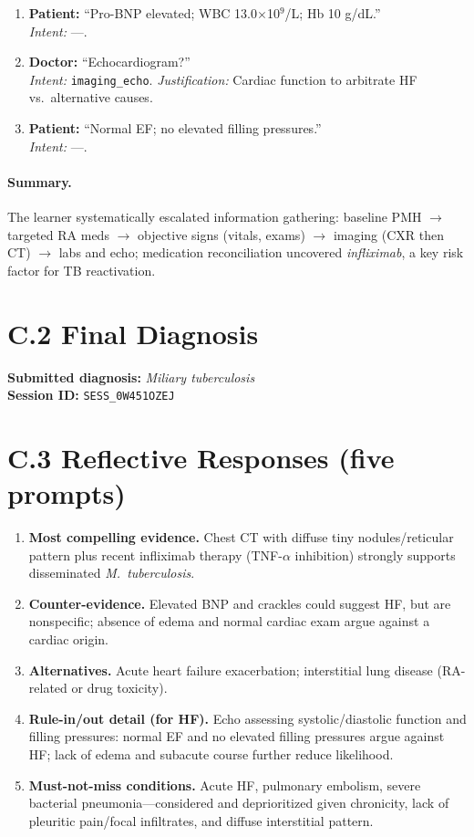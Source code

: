 \begin{enumerate}
  \item \textbf{Patient:} ``Pro-BNP elevated; WBC 13.0$\times$10$^{9}$/L; Hb 10 g/dL.'' \\
  \emph{Intent:} ---.

  \item \textbf{Doctor:} ``Echocardiogram?'' \\
  \emph{Intent:} \texttt{imaging\_echo}. \emph{Justification:} Cardiac function to arbitrate HF vs.\ alternative causes.

  \item \textbf{Patient:} ``Normal EF; no elevated filling pressures.'' \\
  \emph{Intent:} ---.
\end{enumerate}

\paragraph{Summary.} The learner systematically escalated information gathering: baseline PMH $\rightarrow$ targeted RA meds $\rightarrow$ objective signs (vitals, exams) $\rightarrow$ imaging (CXR then CT) $\rightarrow$ labs and echo; medication reconciliation uncovered \emph{infliximab}, a key risk factor for TB reactivation.

\section*{C.2 \quad Final Diagnosis}
\label{app:session_s6:diagnosis}
\noindent
\textbf{Submitted diagnosis:} \emph{Miliary tuberculosis} \\
\textbf{Session ID:} \texttt{SESS\_0W451OZEJ}

\section*{C.3 \quad Reflective Responses (five prompts)}
\label{app:session_s6:reflection}
\begin{enumerate}
  \item \textbf{Most compelling evidence.} Chest CT with diffuse tiny nodules/reticular pattern plus recent infliximab therapy (TNF-$\alpha$ inhibition) strongly supports disseminated \emph{M.\ tuberculosis}.
  \item \textbf{Counter-evidence.} Elevated BNP and crackles could suggest HF, but are nonspecific; absence of edema and normal cardiac exam argue against a cardiac origin.
  \item \textbf{Alternatives.} Acute heart failure exacerbation; interstitial lung disease (RA-related or drug toxicity).
  \item \textbf{Rule-in/out detail (for HF).} Echo assessing systolic/diastolic function and filling pressures: normal EF and no elevated filling pressures argue against HF; lack of edema and subacute course further reduce likelihood.
  \item \textbf{Must-not-miss conditions.} Acute HF, pulmonary embolism, severe bacterial pneumonia—considered and deprioritized given chronicity, lack of pleuritic pain/focal infiltrates, and diffuse interstitial pattern.
\end{enumerate}

